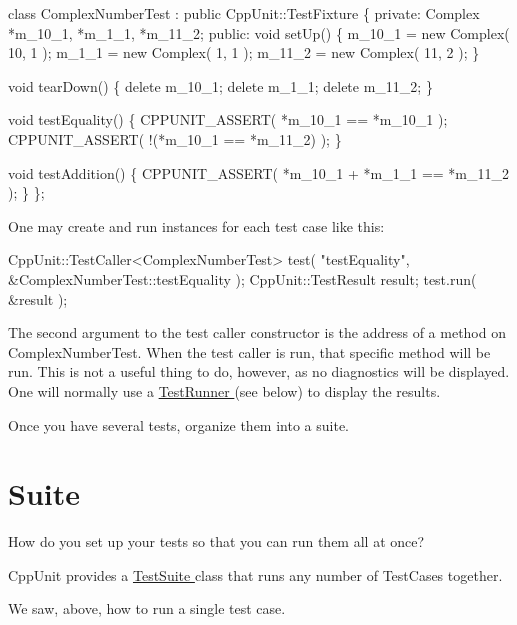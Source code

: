 \begin{DoxyCode}
\textcolor{keyword}{class }ComplexNumberTest : \textcolor{keyword}{public} CppUnit::TestFixture  \{
\textcolor{keyword}{private}:
  Complex *m\_10\_1, *m\_1\_1, *m\_11\_2;
\textcolor{keyword}{public}:
  \textcolor{keywordtype}{void} setUp()
  \{
    m\_10\_1 = \textcolor{keyword}{new} Complex( 10, 1 );
    m\_1\_1 = \textcolor{keyword}{new} Complex( 1, 1 );
    m\_11\_2 = \textcolor{keyword}{new} Complex( 11, 2 );  
  \}

  \textcolor{keywordtype}{void} tearDown() 
  \{
    \textcolor{keyword}{delete} m\_10\_1;
    \textcolor{keyword}{delete} m\_1\_1;
    \textcolor{keyword}{delete} m\_11\_2;
  \}

  \textcolor{keywordtype}{void} testEquality()
  \{
    CPPUNIT\_ASSERT( *m\_10\_1 == *m\_10\_1 );
    CPPUNIT\_ASSERT( !(*m\_10\_1 == *m\_11\_2) );
  \}

  \textcolor{keywordtype}{void} testAddition()
  \{
    CPPUNIT\_ASSERT( *m\_10\_1 + *m\_1\_1 == *m\_11\_2 );
  \}
\};
\end{DoxyCode}


One may create and run instances for each test case like this\+:


\begin{DoxyCode}
CppUnit::TestCaller<ComplexNumberTest> test( \textcolor{stringliteral}{"testEquality"}, 
                                             &ComplexNumberTest::testEquality );
CppUnit::TestResult result;
test.run( &result );
\end{DoxyCode}


The second argument to the test caller constructor is the address of a method on Complex\+Number\+Test. When the test caller is run, that specific method will be run. This is not a useful thing to do, however, as no diagnostics will be displayed. One will normally use a \hyperlink{group___executing_test}{Test\+Runner } (see below) to display the results.

Once you have several tests, organize them into a suite.\hypertarget{cppunit_cookbook_suite}{}\section{Suite}\label{cppunit_cookbook_suite}
How do you set up your tests so that you can run them all at once?

Cpp\+Unit provides a \hyperlink{}{Test\+Suite } class that runs any number of Test\+Cases together.

We saw, above, how to run a single test case.

